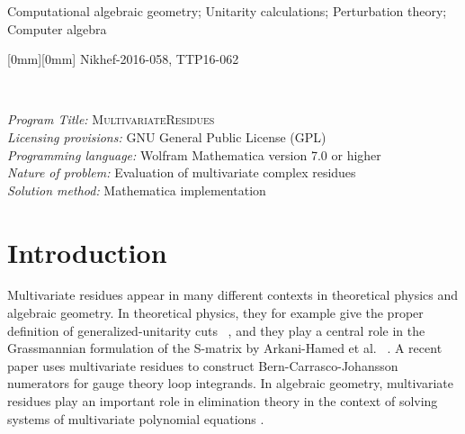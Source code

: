 \documentclass[dvipsnames,preprint,12pt,sort&compress]{elsarticle}
\begin{document}
\begin{frontmatter}
\begin{keyword}
Computational algebraic geometry; Unitarity calculations; Perturbation theory; Computer algebra
\end{keyword}

\end{frontmatter}

\raisebox{155mm}[0mm][0mm]{\hspace{-6mm}
Nikhef-2016-058, TTP16-062
}\vspace{-2mm}



 \\

\begin{small}
\noindent
{\em Program Title:} \textsc{MultivariateResidues}                    \\
{\em Licensing provisions:} GNU General Public License (GPL)          \\
{\em Programming language:} Wolfram Mathematica version 7.0 or higher \\
{\em Nature of problem:} Evaluation of multivariate complex residues  \\
{\em Solution method:} Mathematica implementation
\end{small}




\section{Introduction}\label{sec:introduction}

Multivariate residues appear in many different contexts
in theoretical physics and algebraic geometry. In theoretical physics,
they for example give the proper definition of generalized-unitarity cuts%
~\cite{Cachazo:2008dx,Cachazo:2008vp,Kosower:2011ty,CaronHuot:2012ab,Sogaard:2013fpa,Johansson:2015ava},
and they play a central role in the Grassmannian formulation of the S-matrix
by Arkani-Hamed et al.~%
\cite{ArkaniHamed:2009dn,ArkaniHamed:2009dg,ArkaniHamed:2010gh,ArkaniHamed:2012nw,Arkani-Hamed:2013kca,Arkani-Hamed:2014bca,Arkani-Hamed:2014dca,Bern:2015ple,Herrmann:2016qea}. %
A recent paper \cite{Chen:2017bug} uses multivariate residues to construct Bern-Carrasco-Johansson numerators \cite{Bern:2008qj,Bern:2010ue} for gauge theory loop integrands.
In algebraic geometry, multivariate residues play an important role
in elimination theory in the context of solving systems of
multivariate polynomial equations \cite{CattaniDickenstein}.
\end{document}
